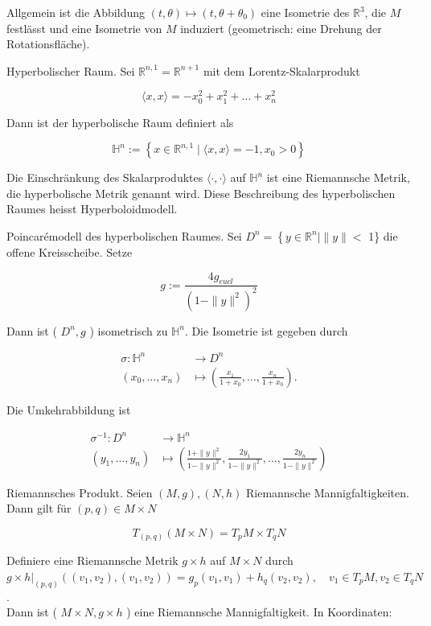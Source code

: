 \documentclass[10pt, letterpaper]{article}
\begin{document}
Allgemein ist die Abbildung $(t, \theta) \mapsto\left(t, \theta+\theta_{0}\right)$ eine Isometrie des $\mathbb{R}^{3}$, die $M$ festlässt und eine Isometrie von $M$ induziert (geometrisch: eine Drehung der Rotationsfläche).

Hyperbolischer Raum. Sei $\mathbb{R}^{n, 1}=\mathbb{R}^{n+1}$ mit dem Lorentz-Skalarprodukt

$$
\langle x, x\rangle=-x_{0}^{2}+x_{1}^{2}+\ldots+x_{n}^{2}
$$

Dann ist der hyperbolische Raum definiert als

$$
\mathbb{H}^{n}:=\left\{x \in \mathbb{R}^{n, 1} \mid\langle x, x\rangle=-1, x_{0}>0\right\}
$$

Die Einschränkung des Skalarproduktes $\langle\cdot, \cdot\rangle$ auf $\mathbb{H}^{n}$ ist eine Riemannsche Metrik, die hyperbolische Metrik genannt wird. Diese Beschreibung des hyperbolischen Raumes heisst Hyperboloidmodell.

Poincarémodell des hyperbolischen Raumes. Sei $D^{n}=\left\{y \in \mathbb{R}^{n} \mid\|y\|<\right.$ 1\} die offene Kreisscheibe. Setze

$$
g:=\frac{4 g_{e u c l}}{\left(1-\|y\|^{2}\right)^{2}}
$$

Dann ist ( $D^{n}, g$ ) isometrisch zu $\mathbb{H}^{n}$. Die Isometrie ist gegeben durch

$$
\begin{aligned}
\sigma: \mathbb{H}^{n} & \rightarrow D^{n} \\
\left(x_{0}, \ldots, x_{n}\right) & \mapsto\left(\frac{x_{1}}{1+x_{0}}, \ldots, \frac{x_{n}}{1+x_{0}}\right) .
\end{aligned}
$$

Die Umkehrabbildung ist

$$
\begin{aligned}
\sigma^{-1}: D^{n} & \rightarrow \mathbb{H}^{n} \\
\left(y_{1}, \ldots, y_{n}\right) & \mapsto\left(\frac{1+\|y\|^{2}}{1-\|y\|^{2}}, \frac{2 y_{1}}{1-\|y\|^{2}}, \ldots, \frac{2 y_{n}}{1-\|y\|^{2}}\right)
\end{aligned}
$$

Riemannsches Produkt. Seien $(M, g),(N, h)$ Riemannsche Mannigfaltigkeiten. Dann gilt für $(p, q) \in M \times N$

$$
T_{(p, q)}(M \times N)=T_{p} M \times T_{q} N
$$

Definiere eine Riemannsche Metrik $g \times h$ auf $M \times N$ durch $g \times\left. h\right|_{(p, q)}\left(\left(v_{1}, v_{2}\right),\left(v_{1}, v_{2}\right)\right)=g_{p}\left(v_{1}, v_{1}\right)+h_{q}\left(v_{2}, v_{2}\right), \quad v_{1} \in T_{p} M, v_{2} \in T_{q} N$.\\
Dann ist ( $M \times N, g \times h$ ) eine Riemannsche Mannigfaltigkeit. In Koordinaten:
\end{document}

